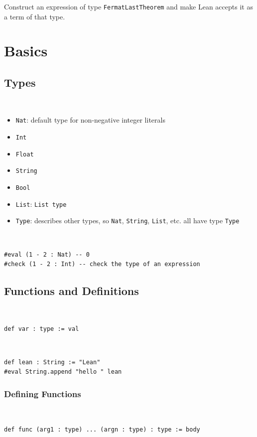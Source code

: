 \documentclass{article}
\begin{document}
Construct an expression of type \verb|FermatLastTheorem| and make Lean accepts it as a term of that type.

\section{Basics}
\subsection{Types}
\begin{definition}[type]~
    \begin{itemize}
        \item \verb|Nat|: default type for non-negative integer literals
        \item \verb|Int|
        \item \verb|Float|
        \item \verb|String|
        \item \verb|Bool|
        \item \verb|List|: \verb|List type|
        \item \verb|Type|: describes other types, so \verb|Nat|, \verb|String|, \verb|List|, etc. all have type \verb|Type|
    \end{itemize}
\end{definition}

\begin{example}~
    \begin{verbatim}
#eval (1 - 2 : Nat) -- 0
#check (1 - 2 : Int) -- check the type of an expression
\end{verbatim}
\end{example}

\subsection{Functions and Definitions}
\begin{definition}[definition]~
    \begin{verbatim}
def var : type := val
\end{verbatim}
\end{definition}

\begin{example}~
    \begin{verbatim}
def lean : String := "Lean"
#eval String.append "hello " lean
\end{verbatim}
\end{example}

\subsubsection{Defining Functions}
\begin{definition}[function]~
    \begin{verbatim}
def func (arg1 : type) ... (argn : type) : type := body
\end{verbatim}
\end{definition}
\end{document}
